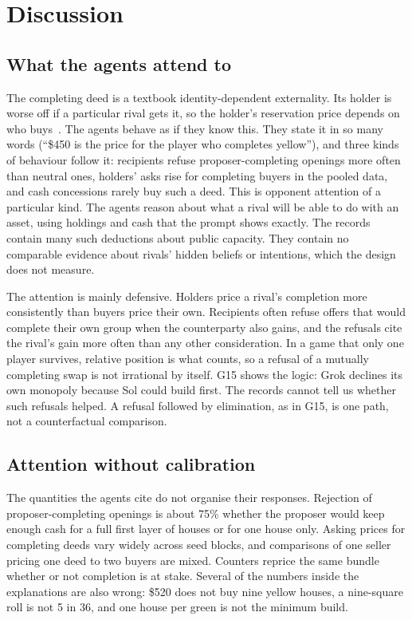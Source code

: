 \section{Discussion}
\label{sec:discussion}

\subsection{What the agents attend to}

The completing deed is a textbook identity-dependent externality. Its holder is worse off if a particular rival gets it, so the holder's reservation price depends on who buys~\cite{jehiel1996nuclear}. The agents behave as if they know this. They state it in so many words (``\$450 is the price for the player who completes yellow''), and three kinds of behaviour follow it: recipients refuse proposer-completing openings more often than neutral ones, holders' asks rise for completing buyers in the pooled data, and cash concessions rarely buy such a deed. This is opponent attention of a particular kind. The agents reason about what a rival will be able to do with an asset, using holdings and cash that the prompt shows exactly. The records contain many such deductions about public capacity. They contain no comparable evidence about rivals' hidden beliefs or intentions, which the design does not measure.

The attention is mainly defensive. Holders price a rival's completion more consistently than buyers price their own. Recipients often refuse offers that would complete their own group when the counterparty also gains, and the refusals cite the rival's gain more often than any other consideration. In a game that only one player survives, relative position is what counts, so a refusal of a mutually completing swap is not irrational by itself. G15 shows the logic: Grok declines its own monopoly because Sol could build first. The records cannot tell us whether such refusals helped. A refusal followed by elimination, as in G15, is one path, not a counterfactual comparison.

\subsection{Attention without calibration}

The quantities the agents cite do not organise their responses. Rejection of proposer-completing openings is about 75\% whether the proposer would keep enough cash for a full first layer of houses or for one house only. Asking prices for completing deeds vary widely across seed blocks, and comparisons of one seller pricing one deed to two buyers are mixed. Counters reprice the same bundle whether or not completion is at stake. Several of the numbers inside the explanations are also wrong: \$520 does not buy nine yellow houses, a nine-square roll is not 5 in 36, and one house per green is not the minimum build.

